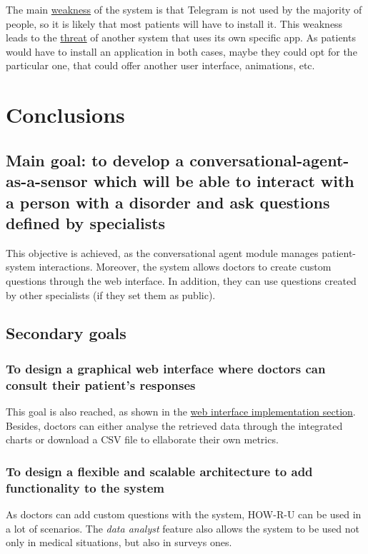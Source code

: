 \documentclass[12pt,english]{article}
\begin{document}
The main  \underline{weakness} of the system is that Telegram is not used by the majority of people, so it is likely that most patients will have to install it. This weakness leads to the  \underline{threat} of another system that uses its own specific app. As patients would have to install an application in both cases, maybe they could opt for the particular one, that could offer another user interface, animations, etc.

\newpage

\section{Conclusions}

\subsection{Main goal: to develop a conversational-agent-as-a-sensor which will be able to interact with a person with a disorder and ask questions defined by specialists}

This objective is achieved, as the conversational agent module manages patient-system interactions. Moreover, the system allows doctors to create custom questions through the web interface. In addition, they can use questions created by other specialists (if they set them as public).

\subsection{Secondary goals}

\subsubsection{To design a graphical web interface where doctors can consult their patient’s responses}

This goal is also reached, as shown in the \hyperref[sec:web_int]{web interface implementation section}. Besides, doctors can either analyse the retrieved data through the integrated charts or download a CSV file to ellaborate their own metrics.

\subsubsection{To design a flexible and scalable architecture to add functionality to the system}

As doctors can add custom questions with the system, HOW-R-U can be used in a lot of scenarios. The \emph{data analyst} feature also allows the system to be used not only in medical situations, but also in surveys ones.
\end{document}
